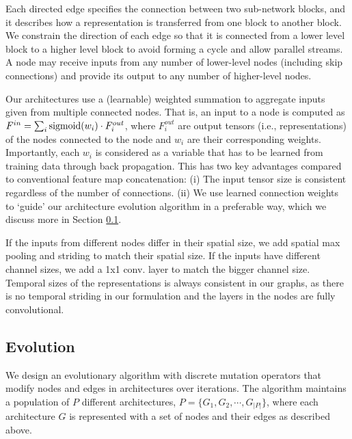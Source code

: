 \documentclass{article} \usepackage{iclr2020_conference,times}
\begin{document}
Each directed edge specifies the connection between two sub-network blocks, and it describes how a representation is transferred from one block to another block. We constrain the direction of each edge so that it is connected from a lower level block to a higher level block to avoid forming a cycle and allow parallel streams. A node may receive inputs from any number of lower-level nodes (including skip connections) and provide its output to any number of higher-level nodes.

Our architectures use a (learnable) weighted summation to aggregate inputs given from multiple connected nodes.  That is, an input to a node is computed as $F^{in} = \sum_i \textnormal{sigmoid}(w_i) \cdot F^{out}_i$, where $F^{out}_i$ are output tensors (i.e., representations) of the nodes connected to the node and $w_i$ are their corresponding weights. Importantly, each $w_i$ is considered as a variable that has to be learned from training data through back propagation. This has two key advantages compared to conventional feature map concatenation: (i) The input tensor size is consistent regardless of the number of connections. (ii) We use learned connection weights to `guide' our architecture evolution algorithm in a preferable way, which we discuss more in Section \ref{subsec:evolution}.



If the inputs from different nodes differ in their spatial size, we add spatial max pooling and striding to match their spatial size. If the inputs have different channel sizes, we add a 1x1 conv. layer to match the bigger channel size. Temporal sizes of the representations is always consistent in our graphs, as there is no temporal striding in our formulation and the layers in the nodes are fully convolutional.












\subsection{Evolution}
\label{subsec:evolution}




We design an evolutionary algorithm with discrete mutation operators that modify nodes and edges in architectures over iterations. The algorithm maintains a population of $P$ different architectures, $P = \{G_1, G_2, \cdots, G_{|P|} \}$, where each architecture $G$ is represented with a set of nodes and their edges as described above.
\end{document}
